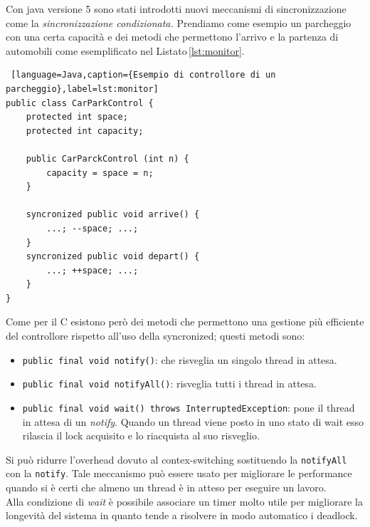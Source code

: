 Con java versione 5 sono stati introdotti nuovi meccanismi di sincronizzazione come la \emph{sincronizzazione condizionata.} Prendiamo come esempio un parcheggio con una certa capacità e dei metodi che permettono l'arrivo e la partenza di automobili come esemplificato nel Listato\,\ref{lst:monitor}.
\begin{lstlisting} [language=Java,caption={Esempio di controllore di un parcheggio},label=lst:monitor]
public class CarParkControl {
	protected int space;
	protected int capacity;
	
	public CarParckControl (int n) {
		capacity = space = n;
	}
	
	syncronized public void arrive() {
		...; --space; ...;
	}
	syncronized public void depart() {
		...; ++space; ...;
	}
}
\end{lstlisting}
Come per il C esistono però dei metodi che permettono una gestione più efficiente del controllore rispetto all'uso della syncronized; questi metodi sono:
\begin{itemize}
\item \texttt{public final void notify()}: che risveglia un singolo thread in attesa.
\item \texttt{public final void notifyAll()}: risveglia tutti i thread in attesa.
\item \texttt{public final void wait() throws InterruptedException}: pone il thread in attesa di un \emph{notify}. Quando un thread viene posto in uno stato di wait esso rilascia il lock acquisito e lo riacquista al suo risveglio.
\end{itemize}

Si può ridurre l'overhead dovuto al contex-switching sostituendo la \texttt{notifyAll} con la \texttt{notify}. Tale meccanismo può essere usato per migliorare le performance quando si è certi che almeno un thread è in atteso per eseguire un lavoro.\\
Alla condizione di \emph{wait} è possibile associare un timer molto utile per migliorare la longevità del sistema in quanto tende a risolvere in modo automatico i deadlock.
